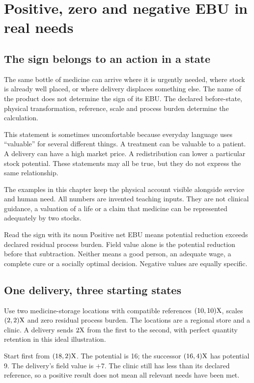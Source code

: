 \chapter{Positive, zero and negative EBU in real needs}\label{ch:signs}

\section{The sign belongs to an action in a state}
The same bottle of medicine can arrive where it is urgently needed, where stock is already well placed, or where delivery displaces something else. The name of the product does not determine the sign of its EBU. The declared before-state, physical transformation, reference, scale and process burden determine the calculation.

This statement is sometimes uncomfortable because everyday language uses ``valuable'' for several different things. A treatment can be valuable to a patient. A delivery can have a high market price. A redistribution can lower a particular stock potential. These statements may all be true, but they do not express the same relationship.

The examples in this chapter keep the physical account visible alongside service and human need. All numbers are invented teaching inputs. They are not clinical guidance, a valuation of a life or a claim that medicine can be represented adequately by two stocks.

\begin{intuitionbox}{Read the sign with its noun}
Positive net EBU means potential reduction exceeds declared residual process burden. Field value alone is the potential reduction before that subtraction. Neither means a good person, an adequate wage, a complete cure or a socially optimal decision. Negative values are equally specific.
\end{intuitionbox}

\section{One delivery, three starting states}
Use two medicine-storage locations with compatible references $(10,10)\mathrm{X}$, scales $(2,2)\mathrm{X}$ and zero residual process burden. The locations are a regional store and a clinic. A delivery sends $2\mathrm{X}$ from the first to the second, with perfect quantity retention in this ideal illustration.

Start first from $(18,2)\mathrm{X}$. The potential is 16; the successor $(16,4)\mathrm{X}$ has potential 9. The delivery's field value is $+7$. The clinic still has less than its declared reference, so a positive result does not mean all relevant needs have been met.

